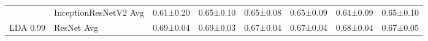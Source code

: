 \begin{landscape}
\begin{table}[]
\begin{tabular}{clllllll}
                            & InceptionResNetV2 Avg              & 0.61±0.20                                  & 0.65±0.10                         & 0.65±0.08                         & 0.65±0.09                         & 0.64±0.09                         & 0.65±0.10                         \\
\multirow{-4}{*}{LDA 0.99}  & ResNet Avg                         & 0.69±0.04                                  & 0.69±0.03                         & 0.67±0.04                         & 0.67±0.04                         & 0.68±0.04                         & 0.67±0.05                        
\end{tabular}
\label{tab:image_classification_reduction_ss}
\end{table}
\end{landscape}